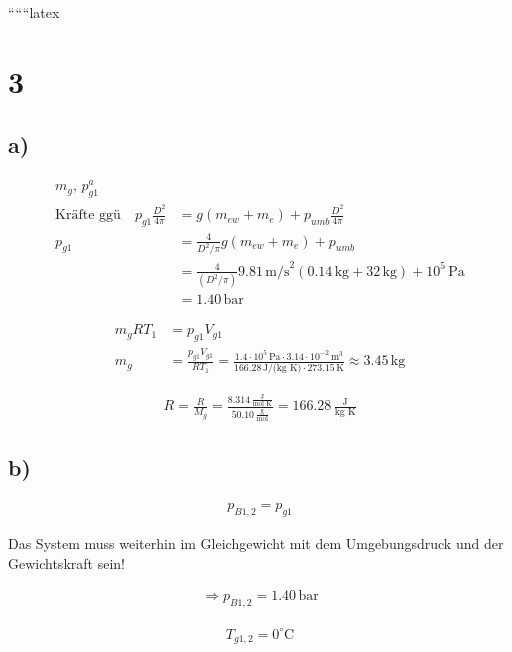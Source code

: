 
``````latex


\section*{3}

\subsection*{a)}

\begin{align*}
    m_g, \, p_{g1}^a \\
    \text{Kräfte ggü} \quad p_{g1} \frac{D^2}{4 \pi} &= g (m_{ew} + m_e) + p_{umb} \frac{D^2}{4 \pi} \\
    p_{g1} &= \frac{4}{D^2 / \pi} g (m_{ew} + m_e) + p_{umb} \\
    &= \frac{4}{(D^2 / \pi)} 9.81 \, \text{m/s}^2 (0.14 \, \text{kg} + 32 \, \text{kg}) + 10^5 \, \text{Pa} \\
    &= 1.40 \, \text{bar}
\end{align*}

\begin{align*}
    m_g R T_1 &= p_{g1} V_{g1} \\
    m_g &= \frac{p_{g1} V_{g1}}{R T_1} = \frac{1.4 \cdot 10^5 \, \text{Pa} \cdot 3.14 \cdot 10^{-2} \, \text{m}^3}{166.28 \, \text{J/(kg K)} \cdot 273.15 \, \text{K}} \approx 3.45 \, \text{kg}
\end{align*}

\begin{align*}
    R = \frac{R}{M_g} = \frac{8.314 \, \frac{\text{J}}{\text{mol K}}}{50.10 \, \frac{\text{g}}{\text{mol}}} = 166.28 \, \frac{\text{J}}{\text{kg K}}
\end{align*}

\subsection*{b)}

\begin{align*}
    p_{B1,2} = p_{g1}
\end{align*}

Das System muss weiterhin im Gleichgewicht mit dem Umgebungsdruck und der Gewichtskraft sein!

\begin{align*}
    \Rightarrow p_{B1,2} = 1.40 \, \text{bar}
\end{align*}

\begin{align*}
    T_{g1,2} = 0^\circ \text{C}
\end{align*}

